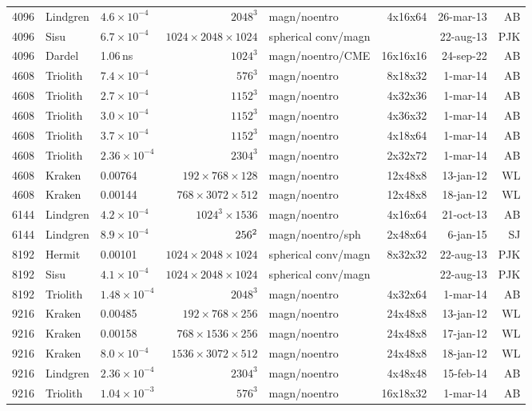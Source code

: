 \documentclass[\mydriver,12pt,twoside,notitlepage,a4paper]{article}
\newcommand{\ns}{\,{\rm ns}}
\begin{document}
\begin{center}
\begin{footnotesize}
\begin{longtable}{rllrlrrr}
4096&Lindgren&$4.6{\!\times\!}10^{-4}$&$2048^3$&magn/noentro&4x16x64&26-mar-13&AB\\
4096&Sisu&$6.7{\!\times\!}10^{-4}$&$1024{\!\times\!}2048{\!\times\!}1024$&spherical conv/magn& &22-aug-13&PJK\\
4096& Dardel &$ $1.06\ns$ $&$1024^3$ & magn/noentro/CME & 16x16x16  & 24-sep-22 & AB \\
4608&Triolith&$7.4{\!\times\!}10^{-4}$&$ 576^3$&magn/noentro&8x18x32& 1-mar-14 & AB \\
4608&Triolith&$2.7{\!\times\!}10^{-4}$&$1152^3$&magn/noentro&4x32x36& 1-mar-14 & AB \\
4608&Triolith&$3.0{\!\times\!}10^{-4}$&$1152^3$&magn/noentro&4x36x32& 1-mar-14 & AB \\
4608&Triolith&$3.7{\!\times\!}10^{-4}$&$1152^3$&magn/noentro&4x18x64& 1-mar-14 & AB \\
4608&Triolith&$2.36{\!\times\!}10^{-4}$&$2304^3$&magn/noentro&2x32x72& 1-mar-14 & AB \\
4608& Kraken&  0.00764 &$192{\!\times\!}768{\!\times\!}128$ & magn/noentro & 12x48x8 &13-jan-12 & WL\\
4608& Kraken& 0.00144  &$768{\!\times\!}3072{\!\times\!}512$ & magn/noentro & 12x48x8 &18-jan-12 & WL\\
6144&Lindgren&$4.2{\!\times\!}10^{-4}$&$1024^3\times1536$&magn/noentro&4x16x64&21-oct-13&AB\\
6144&Lindgren&$8.9{\!\times\!}10^{-4}$&$256\time1152^2$&magn/noentro/sph&2x48x64&6-jan-15&SJ\\
8192&Hermit&0.00101&$1024{\!\times\!}2048{\!\times\!}1024$&spherical conv/magn&8x32x32&22-aug-13&PJK\\
8192&Sisu&$4.1{\!\times\!}10^{-4}$&$1024{\!\times\!}2048{\!\times\!}1024$&spherical conv/magn& &22-aug-13&PJK\\
8192&Triolith&$1.48{\!\times\!}10^{-4}$&$2048^3$&magn/noentro&4x32x64& 1-mar-14 & AB \\
9216& Kraken&  0.00485 &$192{\!\times\!}768{\!\times\!}256$ & magn/noentro & 24x48x8 &13-jan-12 & WL\\
9216& Kraken& 0.00158   &$768{\!\times\!}1536{\!\times\!}256$ & magn/noentro & 24x48x8 &17-jan-12 & WL\\
9216& Kraken& $8.0{\!\times\!}10^{-4}$  &$1536{\!\times\!}3072{\!\times\!}512$ & magn/noentro & 24x48x8 &18-jan-12 & WL\\
9216&Lindgren&$2.36{\!\times\!}10^{-4}$&$2304^3$&magn/noentro&4x48x48&15-feb-14&AB\\
9216&Triolith&$1.04{\!\times\!}10^{-3}$&$ 576^3$&magn/noentro&16x18x32& 1-mar-14 & AB \\

\end{longtable}
\end{footnotesize}
\end{center}
\end{document}
